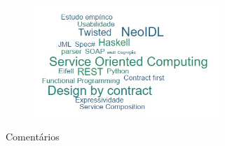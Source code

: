 \documentclass{beamer}
\begin{document}
\begin{frame}

\begin{figure}[h]
\includegraphics[width=7cm]{WordCloud.jpg}
\end{figure}


\end{frame}

\begin{frame}
\huge{Comentários}
\end{frame}

\begin{frame}
\titlepage
\end{frame}
\end{document}
